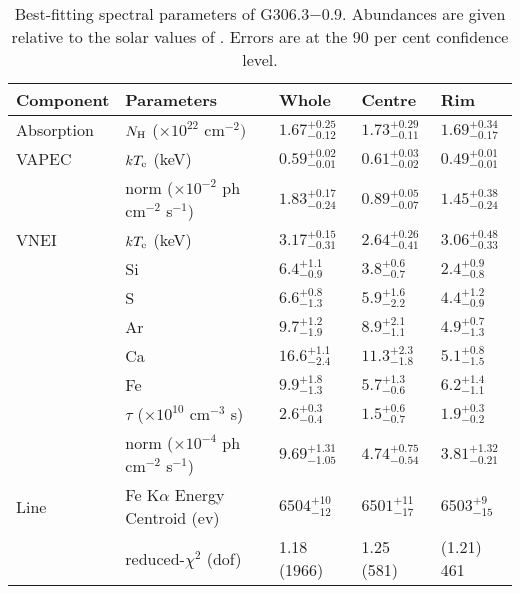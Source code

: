 \documentclass[useAMS,usenatbib]{mn2e}
\begin{document}
\begin{table*}
 \begin{minipage}{170mm}
  \caption{Best-fitting spectral parameters of G306.3$-$0.9. Abundances are given relative to the solar values of \citet {Wi00}. Errors are at the 90 per cent confidence level.}
\renewcommand{\arraystretch}{1.5}
 \begin{tabular}{@{}p{2.2cm}p{6cm}p{2.3cm}p{2.3cm}p{2.3cm}@{}}
  \hline\hline
     Component& Parameters & Whole & Centre & Rim\\
\hline
Absorption & $N_{\rm H}$ ($\times10^{22}$ cm$^{-2})$ & $1.67_{-0.12}^{+0.25}$  & $1.73_{-0.11}^{+0.29}$      & $1.69_{-0.17}^{+0.34}$ \\


VAPEC & $kT_{\rm e}$ (keV)& $0.59_{-0.01}^{+0.02}$  & $0.61_{-0.02}^{+0.03}$    & $0.49_{-0.01}^{+0.01}$  \\

&  norm ($\times10^{-2}$ ph cm$^{-2}$ s$^{-1}$)  &   $1.83_{-0.24}^{+0.17}$  & $0.89_{-0.07}^{+0.05}$  & $1.45_{-0.24}^{+0.38}$ \\

VNEI & $kT_{\rm e}$ (keV)& $3.17_{-0.31}^{+0.15}$  & $2.64_{-0.41}^{+0.26}$    & $3.06_{-0.33}^{+0.48}$  \\

&   Si  & $6.4_{-0.9}^{+1.1}$  & $3.8_{-0.7}^{+0.6}$    & $2.4_{-0.8}^{+0.9}$  \\

&  S  & $6.6_{-1.3}^{+0.8}$  & $5.9_{-2.2}^{+1.6}$     & $4.4_{-0.9}^{+1.2}$  \\

&  Ar  & $9.7_{-1.9}^{+1.2}$  & $8.9_{-1.1}^{+2.1}$      & $4.9_{-1.3}^{+0.7}$ \\

&  Ca  & $16.6_{-2.4}^{+1.1}$  & $11.3_{-1.8}^{+2.3}$     & $5.1_{-1.5}^{+0.8}$  \\

&  Fe  & $9.9_{-1.3}^{+1.8}$  & $5.7_{-0.6}^{+1.3}$     & $6.2_{-1.1}^{+1.4}$  \\

&   $\tau$ ($\times10^{10}$ cm$^{-3}$ s)& $2.6_{-0.4}^{+0.3}$  & $1.5_{-0.7}^{+0.6}$    & $1.9_{-0.2}^{+0.3}$ \\

&  norm ($\times10^{-4}$ ph cm$^{-2}$ s$^{-1}$)  &   $9.69_{-1.05}^{+1.31}$  & $4.74_{-0.54}^{+0.75}$  & $3.81_{-0.21}^{+1.32}$ \\

\hline

Line      &  Fe K$\alpha$  Energy Centroid (ev)  &    $6504_{-12}^{+10}$       &    $6501_{-17}^{+11}$       &    $6503_{-15}^{+9}$        \\

\hline

& reduced-$\chi^{2}$ (dof) & 1.18 (1966)  &  1.25 (581)  &  (1.21) 461   \\

 \hline
\end{tabular}
\end{minipage}
\end{table*}
\end{document}
